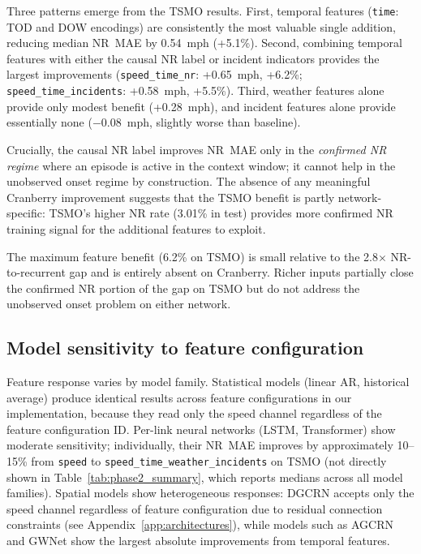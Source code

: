 \documentclass[a4paper]{cas-sc}
\begin{document}
Three patterns emerge from the TSMO results.
First, temporal features (\texttt{time}: TOD and DOW encodings) are
consistently the most valuable single addition, reducing median
NR~MAE by 0.54~mph (+5.1\%).
Second, combining temporal features with either the causal NR label
or incident indicators provides the largest improvements
(\texttt{speed\_time\_nr}: +0.65~mph, +6.2\%;
\texttt{speed\_time\_incidents}: +0.58~mph, +5.5\%).
Third, weather features alone provide only modest benefit (+0.28~mph),
and incident features alone provide essentially none
($-$0.08~mph, slightly worse than baseline).

Crucially, the causal NR label improves NR~MAE only in the
\emph{confirmed NR regime} where an episode is active in the context
window; it cannot help in the unobserved onset regime by construction.
The absence of any meaningful Cranberry improvement suggests that the
TSMO benefit is partly network-specific: TSMO's higher NR rate (3.01\%
in test) provides more confirmed NR training signal for the additional
features to exploit.

The maximum feature benefit (6.2\% on TSMO) is small relative to the
2.8$\times$ NR-to-recurrent gap and is entirely absent on Cranberry.
Richer inputs partially close the confirmed NR portion of the gap
on TSMO but do not address the unobserved onset problem on either network.

\subsection{Model sensitivity to feature configuration}

Feature response varies by model family.
Statistical models (linear AR, historical average) produce identical results across
feature configurations in our implementation, because they read only the speed
channel regardless of the feature configuration ID.
Per-link neural networks (LSTM, Transformer) show moderate
sensitivity; individually, their NR~MAE improves by approximately
10--15\% from \texttt{speed} to \texttt{speed\_time\_weather\_incidents}
on TSMO (not directly shown in Table~\ref{tab:phase2_summary},
which reports medians across all model families).
Spatial models show heterogeneous responses: DGCRN accepts
only the speed channel regardless of feature configuration due to
residual connection constraints (see Appendix~\ref{app:architectures}),
while models such as AGCRN and GWNet show the largest
absolute improvements from temporal features.

\end{document}
